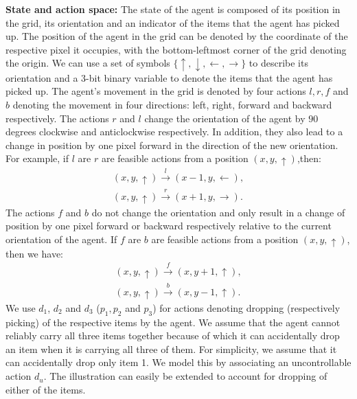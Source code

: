 \documentclass[letterpaper, 10 pt, conference]{ieeeconf}
\begin{document}
\noindent \textbf{State and action space:} The state of the agent is composed of its position in the grid, its orientation and an indicator of the items that the agent has picked up. The position of the agent in the grid can be denoted by the coordinate of the respective pixel it occupies, with the bottom-leftmost corner of the grid denoting the origin. We can use a set of symbols $\{\uparrow, \downarrow, \leftarrow, \rightarrow\}$ to describe its orientation and a 3-bit binary variable to denote the items that the agent has picked up. The agent's movement in the grid is denoted by four actions $l, r, f$ and $b$ denoting the movement in four directions: left, right, forward and backward respectively. The actions $r$ and $l$ change the orientation of the agent by $90$ degrees clockwise and anticlockwise respectively. In addition, they also lead to a change in position by one pixel forward in the direction of the new orientation. For example, if $l$ are $r$ are feasible actions from a position $(x, y, \uparrow)$,then:
\begin{align}
    (x, y, \uparrow) \xrightarrow{l} (x-1, y, \leftarrow), \nonumber \\
    (x, y, \uparrow) \xrightarrow{r} (x+1, y, \rightarrow). \nonumber
\end{align}
The actions $f$ and $b$ do not change the orientation and only result in a change of position by one pixel forward or backward respectively relative to the current orientation of the agent. If $f$ are $b$ are feasible actions from a position $(x, y, \uparrow)$, then we have:
\begin{align}
    (x, y, \uparrow) \xrightarrow{f} (x, y+1, \uparrow), \nonumber \\
    (x, y, \uparrow) \xrightarrow{b} (x, y-1, \uparrow). \nonumber
\end{align}
We use $d_1$, $d_2$ and $d_3$ ($p_1, p_2$ and $p_3$) for actions denoting dropping (respectively picking) of the respective items by the agent. We assume that the agent cannot reliably carry all three items together because of which it can accidentally drop an item when it is carrying all three of them. For simplicity, we assume that it can accidentally drop only item 1. We model this by associating an uncontrollable action $d_u$. The illustration can easily be extended to account for dropping of either of the items.  %
\end{document}
